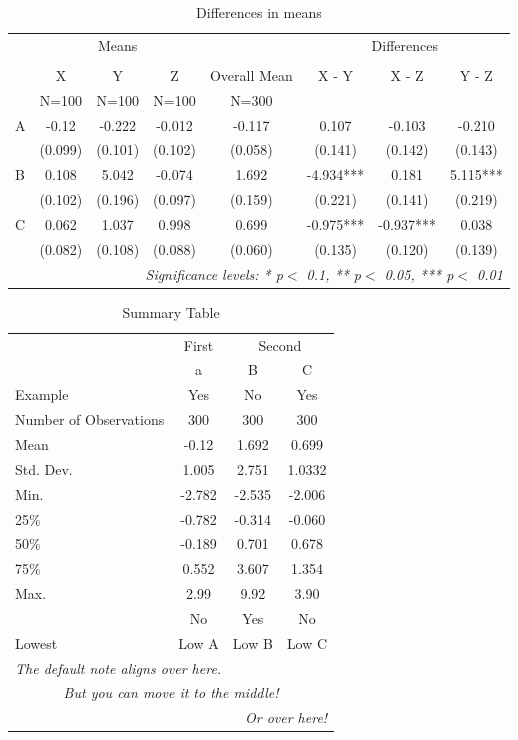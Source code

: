 \begin{table}[!htbp]
  \centering
  \caption{Differences in means}
  \label{table:differencesinmeans}
\begin{tabular}{lccccccc}
  \toprule
   & \multicolumn{3}{c}{Means} & \multicolumn{1}{c}{} & \multicolumn{3}{c}{Differences} \\
  \cline{2-4}\cline{6-8}\\

   & X & Y & Z & Overall Mean & X - Y & X - Z & Y - Z\\
   & N=100 & N=100 & N=100 & N=300 &  &  & \\
  \midrule
  A & -0.12 & -0.222 & -0.012 & -0.117 & 0.107 & -0.103 & -0.210 \\
   & (0.099) & (0.101) & (0.102) & (0.058) & (0.141) & (0.142) & (0.143) \\
  B & 0.108 & 5.042 & -0.074 & 1.692 & -4.934*** & 0.181 & 5.115*** \\
   & (0.102) & (0.196) & (0.097) & (0.159) & (0.221) & (0.141) & (0.219) \\
  C & 0.062 & 1.037 & 0.998 & 0.699 & -0.975*** & -0.937*** & 0.038 \\
   & (0.082) & (0.108) & (0.088) & (0.060) & (0.135) & (0.120) & (0.139) \\
  \bottomrule
  \multicolumn{8}{r}{{\small \textit{Significance levels: * p$<$ 0.1, ** p$<$ 0.05, *** p$<$ 0.01}}}\\
\end{tabular}
\end{table}
\begin{table}[!htbp]
  \centering
\begin{tabular}{lccc}
  \toprule
   & \multicolumn{1}{c}{First} & \multicolumn{2}{c}{Second} \\
   & a & B & C\\
  Example & Yes & No & Yes\\
  \midrule
  Number of Observations & 300 & 300 & 300 \\
  Mean & -0.12 & 1.692 & 0.699 \\
  Std. Dev. & 1.005 & 2.751 & 1.0332 \\
  Min. & -2.782 & -2.535 & -2.006 \\
  25\% & -0.782 & -0.314 & -0.060 \\
  50\% & -0.189 & 0.701 & 0.678 \\
  75\% & 0.552 & 3.607 & 1.354 \\
  Max. & 2.99 & 9.92 & 3.90 \\
   & No & Yes & No\\
  \bottomrule
  Lowest & Low A & Low B & Low C\\
  \bottomrule
  \multicolumn{4}{l}{{\small \textit{The default note aligns over here.}}}\\
  \multicolumn{4}{c}{{\small \textit{But you can move it to the middle!}}}\\
  \multicolumn{4}{r}{{\small \textit{Or over here!}}}\\
\end{tabular}
  \caption{Summary Table}
  \label{table:summarytable}
\end{table}
